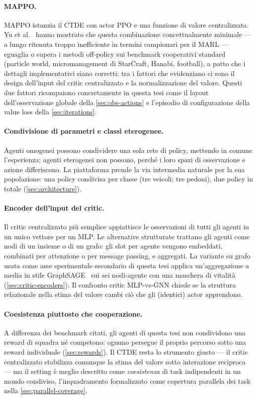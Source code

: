 \paragraph{MAPPO.}
MAPPO istanzia il CTDE con actor PPO e una funzione di valore
centralizzata. Yu et al.~\cite{yu2022surprising} hanno mostrato che
questa combinazione concettualmente minimale --- a lungo ritenuta troppo
inefficiente in termini campionari per il MARL --- eguaglia o supera i
metodi off-policy sui benchmark cooperativi standard (particle world,
micromanagement di StarCraft, Hanabi, football), a patto che i dettagli
implementativi siano corretti; tra i fattori che evidenziano ci sono il
design dell'input del critic centralizzato e la normalizzazione del
valore. Questi due fattori ricompaiono concretamente in questa tesi come
il layout dell'osservazione globale della \cref{sec:obs-actions} e
l'episodio di configurazione della value loss della
\cref{sec:iterations}.

\paragraph{Condivisione di parametri e classi eterogenee.}
Agenti omogenei possono condividere una sola rete di policy, mettendo in
comune l'esperienza; agenti eterogenei non possono, perché i loro spazi
di osservazione e azione differiscono. La piattaforma prende la via
intermedia naturale per la sua popolazione: una policy condivisa per
classe (tre veicoli; tre pedoni), due policy in totale
(\cref{sec:architecture}).

\paragraph{Encoder dell'input del critic.}
Il critic centralizzato più semplice appiattisce le osservazioni di
tutti gli agenti in un unico vettore per un MLP. Le alternative
strutturate trattano gli agenti come nodi di un insieme o di un grafo:
gli slot per agente vengono embeddati, combinati per attenzione o per
message passing, e aggregati. La variante su grafo usata come asse
sperimentale secondario di questa tesi applica un'aggregazione a media
in stile GraphSAGE~\cite{hamilton2017graphsage} sui sei nodi-agente con
una maschera di vitalità (\cref{sec:critic-encoders}). Il confronto
critic MLP-vs-GNN chiede se la struttura relazionale nella stima del
valore cambi ciò che gli (identici) actor apprendono.

\paragraph{Coesistenza piuttosto che cooperazione.}
A differenza dei benchmark citati, gli agenti di questa tesi non
condividono una reward di squadra né competono: ognuno persegue il
proprio percorso sotto una reward individuale (\cref{sec:rewards}). Il
CTDE resta lo strumento giusto --- il critic centralizzato stabilizza
comunque la stima del valore sotto interazione reciproca --- ma il
setting è meglio descritto come \emph{coesistenza} di task indipendenti
in un mondo condiviso, l'inquadramento formalizzato come copertura
parallela dei task nella \cref{sec:parallel-coverage}.

